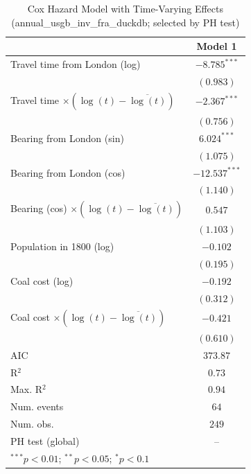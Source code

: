 
\begin{table}
\begin{center}
\begin{tabular}{l c}
\hline
 & Model 1 \\
\hline
Travel time from London (log) & $-8.785^{***}$ \\
 & $(0.983)$ \\
Travel time $\times (\log(t)-\overline{\log(t)})$ & $-2.367^{***}$ \\
 & $(0.756)$ \\
Bearing from London (sin) & $6.024^{***}$ \\
 & $(1.075)$ \\
Bearing from London (cos) & $-12.537^{***}$ \\
 & $(1.140)$ \\
Bearing (cos) $\times (\log(t)-\overline{\log(t)})$ & $0.547$ \\
 & $(1.103)$ \\
Population in 1800 (log) & $-0.102$ \\
 & $(0.195)$ \\
Coal cost (log) & $-0.192$ \\
 & $(0.312)$ \\
Coal cost $\times (\log(t)-\overline{\log(t)})$ & $-0.421$ \\
 & $(0.610)$ \\
\hline
AIC              & $373.87$ \\
R$^2$            & $0.73$ \\
Max. R$^2$       & $0.94$ \\
Num. events      & $64$ \\
Num. obs.        & $249$ \\
PH test (global) & -- \\
\hline
\multicolumn{2}{l}{\scriptsize{$^{***}p<0.01$; $^{**}p<0.05$; $^{*}p<0.1$}}
\end{tabular}
\caption{Cox Hazard Model with Time-Varying Effects (annual\_usgb\_inv\_fra\_duckdb; selected by PH test)}
\label{tab:cox_serious_tv_annual_usgb_inv_fra_duckdb}
\end{center}
\end{table}
